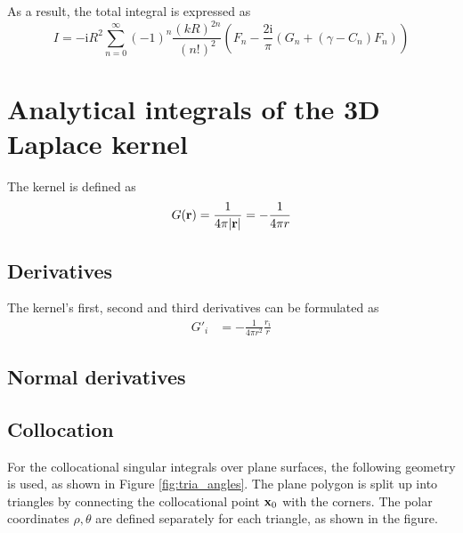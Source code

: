 \documentclass[a4paper,11pt]{article}
\newcommand{\ti}{\mathrm{i}}
\begin{document}
As a result, the total integral is expressed as
%
\begin{equation}
I = -\ti R^2
\sum_{n=0}^{\infty} (-1)^n \frac{(kR)^{2n}}{\left(n!\right)^2}
\left(
F_n
- \frac{2 \ti}{\pi}
\left(G_n + \left(\gamma - C_n \right) F_n \right)
\right)
\end{equation}


\section{Analytical integrals of the 3D Laplace kernel}

The kernel is defined as
%
\begin{equation}
	G({\bf r}) = \frac{1}{4\pi|{\bf r}|} = -\frac{1}{4\pi r}
\end{equation}

\subsection{Derivatives}

The kernel's first, second and third derivatives can be formulated as
%
\begin{align}
	G'_{i}
	&= -\frac{1}{4\pi r^2} \frac{r_i}{r}
	\label{eq:laplace_3d_gradient}
\end{align}



\subsection{Normal derivatives}


\subsection{Collocation}

For the collocational singular integrals over plane surfaces, the following geometry is used, as shown in Figure \ref{fig:tria_angles}.
The plane polygon is split up into triangles by connecting the collocational point ${\bf x}_0$ with the corners.
The polar coordinates $\rho, \theta$ are defined separately for each triangle, as shown in the figure.
\end{document}
